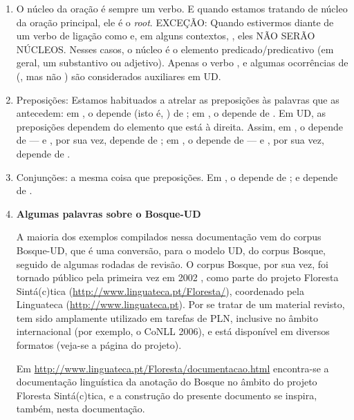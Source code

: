 \documentclass[output=paper,colorlinks,citecolor=brown]{langscibook}
\begin{document}
	\begin{enumerate}
		\item O núcleo da oração é sempre um verbo. E quando estamos tratando de núcleo da oração principal, ele é o \emph{root}. EXCEÇÃO: Quando estivermos diante de um verbo de ligação como  e, em alguns contextos, , eles NÃO SERÃO NÚCLEOS. Nesses casos, o núcleo é o elemento predicado/predicativo (em geral, um substantivo ou adjetivo). Apenas o verbo , e algumas ocorrências de  (, mas não ) são considerados auxiliares em UD. 

		\item Preposições: Estamos habituados a atrelar as preposições às palavras que as antecedem: em , o  depende (isto é,  ) de  ; em , o  depende de . Em UD, as preposições dependem do elemento que está à direita. Assim, em , o  depende de  — e , por sua vez, depende de ; em , o  depende de  — e , por sua vez, depende de . 

		\item Conjunções: a mesma coisa que preposições. Em , o  depende de ; e  depende de .

		\item \textbf{Algumas palavras sobre o Bosque-UD}

		A maioria dos exemplos compilados nessa documentação vem do corpus Bosque-UD, que é uma conversão, para o modelo UD, do corpus Bosque, seguido de algumas rodadas de revisão. O corpus Bosque, por sua vez, foi tornado público pela primeira vez em 2002 \citep{santos2002floresta}, como parte do projeto Floresta Sintá(c)tica (\href{http://www.linguateca.pt/Floresta/}{http://www.linguateca.pt/Floresta/}), coordenado pela Linguateca (\href{http://www.linguateca.pt}{http://www.linguateca.pt}).  Por se tratar de um material revisto, tem sido amplamente utilizado em tarefas de PLN, inclusive no âmbito internacional (por exemplo, o CoNLL 2006), e está disponível em diversos formatos (veja-se a página do projeto).
		
		Em \href{http://www.linguateca.pt/Floresta/documentacao.html}{http://www.linguateca.pt/Floresta/documentacao.html} encontra-se a documentação linguística da anotação do Bosque no âmbito do projeto Floresta Sintá(c)tica, e a construção do presente documento se inspira, também, nesta documentação. 
	\end{enumerate}
\end{document}

